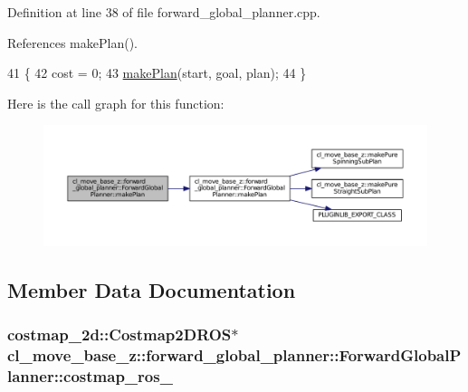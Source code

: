 Definition at line 38 of file forward\+\_\+global\+\_\+planner.\+cpp.



References make\+Plan().


\begin{DoxyCode}
41 \{
42     cost = 0;
43     \hyperlink{classcl__move__base__z_1_1forward__global__planner_1_1ForwardGlobalPlanner_a9d7c48877a390ca3cc580a7ffa50d316}{makePlan}(start, goal, plan);
44 \}
\end{DoxyCode}


Here is the call graph for this function\+:
\nopagebreak
\begin{figure}[H]
\begin{center}
\leavevmode
\includegraphics[width=350pt]{classcl__move__base__z_1_1forward__global__planner_1_1ForwardGlobalPlanner_ab01769603169105e92d9b6e479147bce_cgraph}
\end{center}
\end{figure}




\subsection{Member Data Documentation}
\subsubsection[{\texorpdfstring{costmap\+\_\+ros\+\_\+}{costmap_ros_}}]{\setlength{\rightskip}{0pt plus 5cm}costmap\+\_\+2d\+::\+Costmap2\+D\+R\+OS$\ast$ cl\+\_\+move\+\_\+base\+\_\+z\+::forward\+\_\+global\+\_\+planner\+::\+Forward\+Global\+Planner\+::costmap\+\_\+ros\+\_\+\hspace{0.3cm}{\ttfamily [private]}}\hypertarget{classcl__move__base__z_1_1forward__global__planner_1_1ForwardGlobalPlanner_a711d4a0d92a216eb8cab3b42f18eb795}{}\label{classcl__move__base__z_1_1forward__global__planner_1_1ForwardGlobalPlanner_a711d4a0d92a216eb8cab3b42f18eb795}


